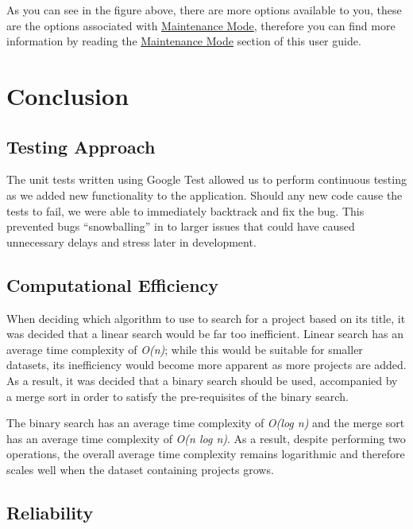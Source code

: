 \documentclass[
  english,
  a4paper,
,tablecaptionabove
]{scrartcl}
\begin{document}
As you can see in the figure above, there are more options available to
you, these are the options associated with
\protect\hyperlink{using-maintenance-mode}{Maintenance Mode}, therefore
you can find more information by reading the
\protect\hyperlink{using-maintenance-mode}{Maintenance Mode} section of
this user guide.

\newpage

\hypertarget{conclusion}{%
\section{Conclusion}\label{conclusion}}

\hypertarget{testing-approach}{%
\subsection{Testing Approach}\label{testing-approach}}

The unit tests written using Google Test allowed us to perform
continuous testing as we added new functionality to the application.
Should any new code cause the tests to fail, we were able to immediately
backtrack and fix the bug. This prevented bugs \enquote{snowballing} in
to larger issues that could have caused unnecessary delays and stress
later in development.

\hypertarget{computational-efficiency}{%
\subsection{Computational Efficiency}\label{computational-efficiency}}

When deciding which algorithm to use to search for a project based on
its title, it was decided that a linear search would be far too
inefficient. Linear search has an average time complexity of
\emph{O(n)}; while this would be suitable for smaller datasets, its
inefficiency would become more apparent as more projects are added. As a
result, it was decided that a binary search should be used, accompanied
by a merge sort in order to satisfy the pre-requisites of the binary
search.

The binary search has an average time complexity of \emph{O(log n)} and
the merge sort has an average time complexity of \emph{O(n log n)}. As a
result, despite performing two operations, the overall average time
complexity remains logarithmic and therefore scales well when the
dataset containing projects grows.

\hypertarget{reliability}{%
\subsection{Reliability}\label{reliability}}
\end{document}
